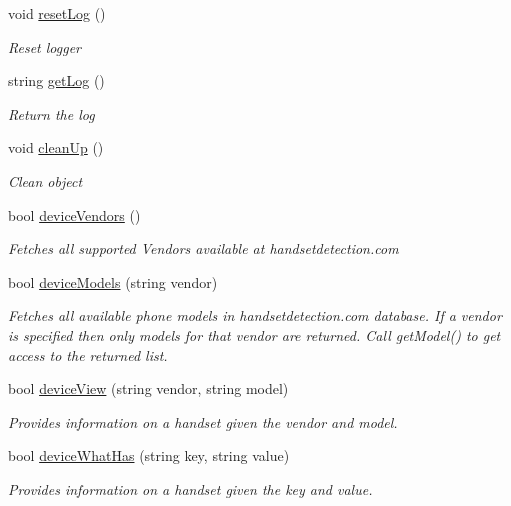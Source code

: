 \begin{DoxyCompactItemize}
\item 
void \hyperlink{class_h_d3_1_1_h_d3_a92e1a5bec8573497497bb7e4082a6b5c}{reset\+Log} ()
\begin{DoxyCompactList}\small\item\em Reset logger \end{DoxyCompactList}\item 
string \hyperlink{class_h_d3_1_1_h_d3_a2436e33681884291c6ad1b2ee112e17b}{get\+Log} ()
\begin{DoxyCompactList}\small\item\em Return the log \end{DoxyCompactList}\item 
void \hyperlink{class_h_d3_1_1_h_d3_a0431d69035a8245a195f9060d5525790}{clean\+Up} ()
\begin{DoxyCompactList}\small\item\em Clean object \end{DoxyCompactList}\item 
bool \hyperlink{class_h_d3_1_1_h_d3_aa2f63450321e2f47b2cb3baf8ff1a5e8}{device\+Vendors} ()
\begin{DoxyCompactList}\small\item\em Fetches all supported Vendors available at handsetdetection.\+com\end{DoxyCompactList}\item 
bool \hyperlink{class_h_d3_1_1_h_d3_a5af669048eb1d372a703dd53b242fe2f}{device\+Models} (string vendor)
\begin{DoxyCompactList}\small\item\em Fetches all available phone models in handsetdetection.\+com database. If a vendor is specified then only models for that vendor are returned. Call get\+Model() to get access to the returned list. \end{DoxyCompactList}\item 
bool \hyperlink{class_h_d3_1_1_h_d3_aaba6d717a4579ca6fa7c5727e5d92333}{device\+View} (string vendor, string model)
\begin{DoxyCompactList}\small\item\em Provides information on a handset given the vendor and model. \end{DoxyCompactList}\item 
bool \hyperlink{class_h_d3_1_1_h_d3_a9640edbaf4dd41cd1c8bec9fa86f53a6}{device\+What\+Has} (string key, string value)
\begin{DoxyCompactList}\small\item\em Provides information on a handset given the key and value. \end{DoxyCompactList}\item 

\end{DoxyCompactItemize}
